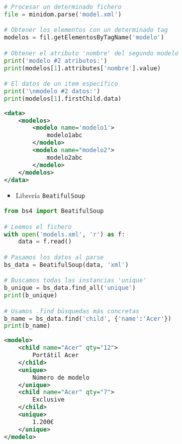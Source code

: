 \begin{minipage}{0.55\textwidth}
\begin{lstlisting}[language=python]
# Procesar un determinado fichero
file = minidom.parse('model.xml')

# Obtener los elementos con un determinado tag
modelos = fil.getElementosByTagName('modelo')

# Obtener el atributo 'nombre' del segundo modelo
print('modelo #2 atributos:')
print(modelos[1].attributes['nombre'].value)

# El datos de un item específico
print('\nmodelo #2 datos:')
print(modelos[1].firstChild.data)
\end{lstlisting}
\end{minipage}\qquad\begin{minipage}{0.4\textwidth}
\begin{lstlisting}[language=XML]
<data>
    <modelos>
        <modelo name='modelo1'>
            modelo1abc
        </modelo>
        <modelo name="modelo2">
            modelo2abc
        </modelo>
    </modelos>
</data>
\end{lstlisting}
\end{minipage}

\begin{itemize}[label=\color{red}\textbullet, leftmargin=*]
	\item \color{lightblue}Librería \texttt{BeatifulSoup}
\end{itemize}
\begin{minipage}{0.55\textwidth}
\begin{lstlisting}[language=python]
from bs4 import BeatifulSoup

# Leemos el fichero
with open('models.xml', 'r') as f:
    data = f.read()

# Pasamos los datos al parse
bs_data = BeatifulSoup(data, 'xml')

# Buscamos todas las instancias 'unique'
b_unique = bs_data.find_all('unique')
print(b_unique)

# Usamos .find búsquedas más concretas
b_name = bs_data.find('child', {'name':'Acer'})
print(b_name)
\end{lstlisting}
\end{minipage}\qquad\begin{minipage}{0.4\textwidth}
\begin{lstlisting}[language=XML]
<modelo>
    <child name="Acer" qty="12">
        Portátil Acer
    </child>
    <unique>
        Número de modelo
    </unique>
    <child name="Acer" qty="7">
        Exclusive
    </child>
    <unique>
        1.200€
    </unique>
</modelo>
\end{lstlisting}
\end{minipage}
